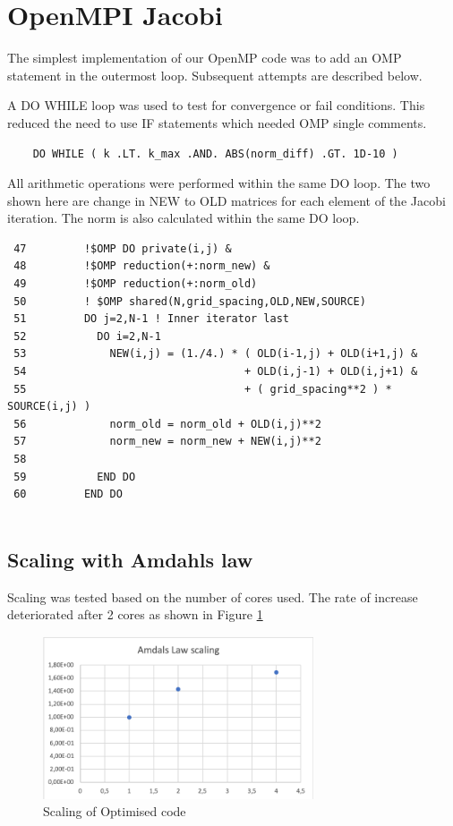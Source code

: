 \documentclass{article}
\begin{document}
\section{OpenMPI Jacobi}

The simplest implementation of our OpenMP code was to add an OMP statement in the outermost loop. Subsequent attempts are described below. 

A DO WHILE loop was used to test for convergence or fail conditions. This reduced the need to use IF statements which needed OMP single comments. 
\begin{verbatim}
    DO WHILE ( k .LT. k_max .AND. ABS(norm_diff) .GT. 1D-10 )
\end{verbatim}

All arithmetic operations were performed within the same DO loop. The two shown here are change in NEW to OLD matrices for each element of the Jacobi iteration. The norm is also calculated within the same DO loop. 

\begin{verbatim}
 47         !$OMP DO private(i,j) &
 48         !$OMP reduction(+:norm_new) &
 49         !$OMP reduction(+:norm_old)
 50         ! $OMP shared(N,grid_spacing,OLD,NEW,SOURCE)
 51         DO j=2,N-1 ! Inner iterator last
 52           DO i=2,N-1
 53             NEW(i,j) = (1./4.) * ( OLD(i-1,j) + OLD(i+1,j) &
 54                                  + OLD(i,j-1) + OLD(i,j+1) &
 55                                  + ( grid_spacing**2 ) * SOURCE(i,j) )
 56             norm_old = norm_old + OLD(i,j)**2
 57             norm_new = norm_new + NEW(i,j)**2
 58
 59           END DO
 60         END DO
 
\end{verbatim}

\FloatBarrier

 \subsection{Scaling with Amdahls law}
 
 Scaling was tested based on the number of cores used. The rate of increase deteriorated after 2 cores as shown in Figure \ref{fig:scaling_opt}
 \clearpage
 \begin{figure}
     \centering
     \includegraphics[width=8cm]{figures/scaling_opt.png}
     \caption{Scaling of Optimised code}
     \label{fig:scaling_opt}
 \end{figure}
\end{document}
